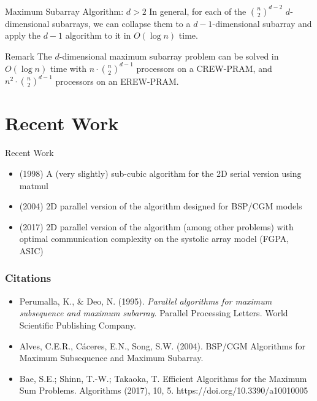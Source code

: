 \documentclass{beamer}
\begin{document}
\begin{frame}{Maximum Subarray Algorithm: $d > 2$}
  In general, for each of the $\binom{n}{2}^{d - 2}$ $d$-dimensional subarrays, we can collapse them to a $d - 1$-dimensional subarray and apply the $d - 1$ algorithm to it in $O(\log n)$ time.

  \begin{block}{Remark}
    The $d$-dimensional maximum subarray problem can be solved in $O(\log n)$ time with $n \cdot \binom{n}{2}^{d - 1}$ processors on a CREW-PRAM, and $n^2 \cdot \binom{n}{2}^{d - 1}$ processors on an EREW-PRAM.
  \end{block}
\end{frame}

\section{Recent Work}

\begin{frame}{Recent Work}
  \begin{itemize}
    \item (1998) A (very slightly) sub-cubic algorithm for the 2D serial version using matmul
    \item (2004) 2D parallel version of the algorithm designed for BSP/CGM models
    \item (2017) 2D parallel version of the algorithm (among other problems) with optimal communication complexity on the systolic array model (FGPA, ASIC)
  \end{itemize}
\end{frame}

\begin{frame}
\frametitle{Citations}
\begin{itemize}
  \item Perumalla, K., \& Deo, N. (1995). \textit{Parallel algorithms for maximum subsequence and maximum subarray}. Parallel Processing Letters. World Scientific Publishing Company.
  \item Alves, C.E.R., Cáceres, E.N., Song, S.W. (2004). BSP/CGM Algorithms for Maximum Subsequence and Maximum Subarray.
  \item Bae, S.E.; Shinn, T.-W.; Takaoka, T. Efficient Algorithms for the Maximum Sum Problems. Algorithms (2017), 10, 5. https://doi.org/10.3390/a10010005
\end{itemize}
\end{frame}
\end{document}
